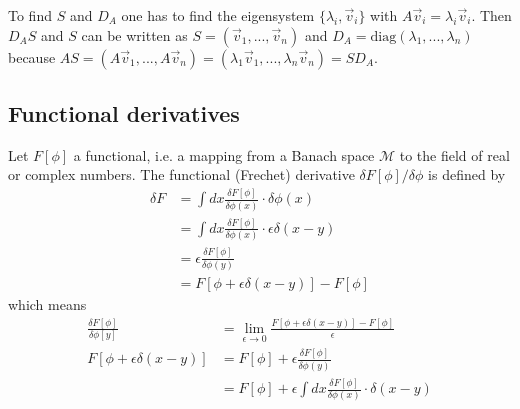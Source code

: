\documentclass[10pt,a4paper]{article}
\theoremstyle{definition}
\begin{document}
To find $S$ and $D_A$ one has to find the eigensystem $\{\lambda_i,\vec{v}_i\}$ with $A\vec{v}_i=\lambda_i\vec{v}_i$. Then $D_AS$ and $S$ can be written as $S=(\vec{v}_1,...,\vec{v}_n)$ and $D_A=\text{diag}(\lambda_1,...,\lambda_n)$ because $AS=(A\vec{v}_1,...,A\vec{v}_n)=(\lambda_1\vec{v}_1,...,\lambda_n\vec{v}_n)=SD_A$.

\subsection{Functional derivatives}
Let $F[\phi]$ a functional, i.e. a mapping from a Banach space $\mathcal{M}$ to the field of real or complex numbers. The functional (Frechet) derivative $\delta F[\phi]/\delta\phi$ is defined by
\begin{align}
    \delta F
    &=\int dx \frac{\delta F[\phi]}{\delta\phi(x)}\cdot\delta\phi(x)\\
    &=\int dx \frac{\delta F[\phi]}{\delta\phi(x)}\cdot\epsilon\delta(x-y)\\
    &=\epsilon\frac{\delta F[\phi]}{\delta\phi(y)}\\
    &=F[\phi+\epsilon\delta(x-y)]-F[\phi]
\end{align}
which means
\begin{align}
    \frac{\delta F[\phi]}{\delta\phi[y]}&=\lim_{\epsilon\rightarrow0}\frac{F[\phi+\epsilon\delta(x-y)]-F[\phi]}{\epsilon}\\
    F[\phi+\epsilon\delta(x-y)]&=F[\phi]+\epsilon\frac{\delta F[\phi]}{\delta\phi(y)}\\
    &=F[\phi]+\epsilon\int dx \frac{\delta F[\phi]}{\delta\phi(x)}\cdot\delta(x-y)
\end{align}
\end{document}
